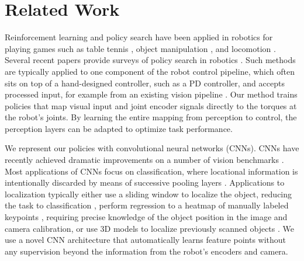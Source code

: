 \documentclass[conference]{IEEEtran}
\begin{document}
\section{Related Work}
\label{sec:related}

Reinforcement learning and policy search have been applied in robotics for playing games such as table tennis \cite{kop-rlarm-10}, object manipulation \cite{drf-lclcm-11,phas-lgmsl-09}, and locomotion \cite{emmnc-lcbbl-08,gpw-fbwrc-06,kp-pgrlf-04,tzs-spgrl-04}. Several recent papers provide surveys of policy search in robotics \cite{dnp-spsr-13,kbp-rlrs-13}. Such methods are typically applied to one component of the robot control pipeline, which often sits on top of a hand-designed controller, such as a PD controller, and accepts processed input, for example from an existing vision pipeline \cite{phas-lgmsl-09}. Our method trains policies that map visual input and joint encoder signals directly to the torques at the robot's joints. By learning the entire mapping from perception to control, the perception layers can be adapted to optimize task performance.

We represent our policies with convolutional neural networks (CNNs). CNNs have recently achieved dramatic improvements on a number of vision benchmarks \cite{gddm-fhaod-13,ksh-incdc-12,tjlb-jcngm-14}. Most applications of CNNs focus on classification, where locational information is intentionally discarded by means of successive pooling layers \cite{lgrn-cdbn-09}. Applications to localization typically either use a sliding window to localize the object, reducing the task to classification \cite{gddm-fhaod-13}, perform regression to a heatmap of manually labeled keypoints \cite{tjlb-jcngm-14}, requiring precise knowledge of the object position in the image and camera calibration, or use 3D models to localize previously scanned objects \cite{psgs-3ddpm-12,sl-3dgoc-07}. We use a novel CNN architecture that automatically learns feature points without any supervision beyond the information from the robot's encoders and camera.
\end{document}
